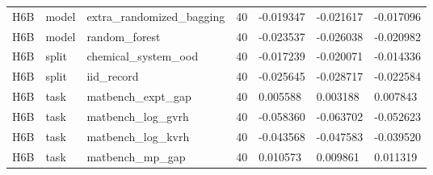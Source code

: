 \documentclass[10pt]{article}
\begin{document}
\begin{landscape}
\begin{longtable}{L{.35in}L{.6in}L{3.55in}L{.4in}L{.88in}L{.88in}L{.88in}}
H6B & model & extra\_\allowbreak{}randomized\_\allowbreak{}bagging & 40 & -0.019347 & -0.021617 & -0.017096\\
H6B & model & random\_\allowbreak{}forest & 40 & -0.023537 & -0.026038 & -0.020982\\
H6B & split & chemical\_\allowbreak{}system\_\allowbreak{}ood & 40 & -0.017239 & -0.020071 & -0.014336\\
H6B & split & iid\_\allowbreak{}record & 40 & -0.025645 & -0.028717 & -0.022584\\
H6B & task & matbench\_\allowbreak{}expt\_\allowbreak{}gap & 40 & 0.005588 & 0.003188 & 0.007843\\
H6B & task & matbench\_\allowbreak{}log\_\allowbreak{}gvrh & 40 & -0.058360 & -0.063702 & -0.052623\\
H6B & task & matbench\_\allowbreak{}log\_\allowbreak{}kvrh & 40 & -0.043568 & -0.047583 & -0.039520\\
H6B & task & matbench\_\allowbreak{}mp\_\allowbreak{}gap & 40 & 0.010573 & 0.009861 & 0.011319\\
\bottomrule
\end{longtable}
\endgroup

\end{landscape}
\end{document}
